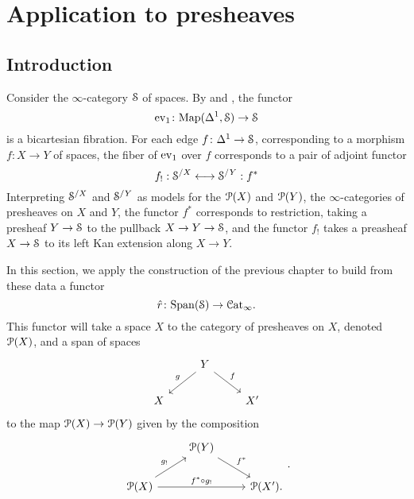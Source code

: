 \documentclass[main.tex]{subfiles}
\begin{document}
\section{Application to presheaves}
\label{sec:application_to_presheaves}

\subsection{Introduction}
\label{ssc:introduction}

Consider the $\infty$-category $\S$ of spaces. By \cite[Lemma 6.1.1.1]{highertopostheory} and \cite[Lemma 2.4.7.12]{highertopostheory}, the functor
\begin{equation}
  \label{eq:ev1}
  \ev_{1}\colon \Map(\Delta^{1}, \S) \to \S
\end{equation}
is a bicartesian fibration. For each edge $f\colon \Delta^{1} \to \S$, corresponding to a morphism $f\colon X \to Y$ of spaces, the fiber of $\ev_{1}$ over $f$ corresponds to a pair of adjoint functor
\begin{equation*}
  f_{!} : \S^{/X} \longleftrightarrow \S^{/Y} : f^{*}
\end{equation*}
Interpreting $\S^{/X}$ and $\S^{/Y}$ as models for the $\P(X)$ and $\P(Y)$, the $\infty$-categories of presheaves on $X$ and $Y$, the functor $f^{*}$ corresponds to restriction, taking a presheaf $Y \to \S$ to the pullback $X \to Y \to \S$, and the functor $f_{!}$ takes a preasheaf $X \to \S$ to its left Kan extension along $X \to Y$.

In this section, we apply the construction of the previous chapter to build from these data a functor
\begin{equation}
  \label{eq:rhat}
  \hat{r}\colon \Span(\S) \to \ICat.
\end{equation}
This functor will take a space $X$ to the category of presheaves on $X$, denoted $\P(X)$, and a span of spaces
\begin{equation*}
  \begin{tikzcd}
    & Y
    \arrow[dl, swap, "g"]
    \arrow[dr, "f"]
    \\
    X
    && X'
  \end{tikzcd}
\end{equation*}
to the map $\P(X) \to \P(Y)$ given by the composition
\begin{equation*}
  \begin{tikzcd}
    & \P(Y)
    \arrow[dr, "f^{*}"]
    \\
    \P(X)
    \arrow[ur, "g_{!}"]
    \arrow[rr, "f^{*} \circ g_{!}"]
    && \P(X').
  \end{tikzcd}.
\end{equation*}
\end{document}
